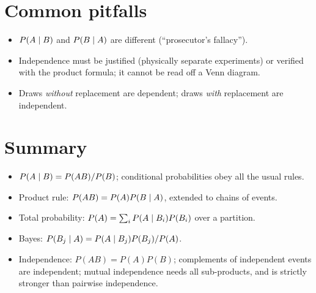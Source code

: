 \section{Common pitfalls}

\begin{itemize}
  \item $P(A\mid B)$ and $P(B\mid A)$ are different (``prosecutor's fallacy'').
  \item Independence must be justified (physically separate experiments) or verified with
        the product formula; it cannot be read off a Venn diagram.
  \item Draws \emph{without} replacement are dependent; draws \emph{with} replacement are
        independent.
\end{itemize}

\section{Summary}

\begin{itemize}
  \item $P(A\mid B) = P(AB)/P(B)$; conditional probabilities obey all the usual rules.
  \item Product rule: $P(AB) = P(A)P(B\mid A)$, extended to chains of events.
  \item Total probability: $P(A) = \sum_i P(A\mid B_i)P(B_i)$ over a partition.
  \item Bayes: $P(B_j\mid A) = P(A\mid B_j)P(B_j)/P(A)$.
  \item Independence: $P(AB) = P(A)P(B)$; complements of independent events are
        independent; mutual independence needs all sub-products, and is strictly
        stronger than pairwise independence.
\end{itemize}
